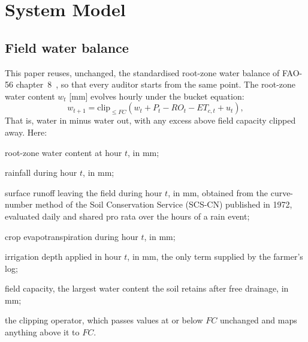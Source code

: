 \section{System Model}
\label{sec:model}

\subsection{Field water balance}

This paper reuses, unchanged, the standardised root-zone water balance of FAO-56
chapter~8~\cite{fao56}, so that every auditor starts from the same point. The root-zone
water content $w_t$ [mm] evolves hourly under the bucket equation:
\begin{equation}
w_{t+1}=\mathrm{clip}_{\le FC}\!\left(w_t+P_t-RO_t-ET_{c,t}+u_t\right),
\label{eq:bucket}
\end{equation}
That is, water in minus water out, with any excess above field capacity clipped
away. Here:
\begin{symbolist}
\item[$w_t$] root-zone water content at hour $t$, in mm;
\item[$P_t$] rainfall during hour $t$, in mm;
\item[$RO_t$] surface runoff leaving the field during hour $t$, in mm, obtained
  from the curve-number method of the Soil Conservation Service (SCS-CN) published
  in 1972, evaluated daily and shared pro rata over the hours of a rain event;
\item[$ET_{c,t}$] crop evapotranspiration during hour $t$, in mm;
\item[$u_t$] irrigation depth applied in hour $t$, in mm, the only term supplied
  by the farmer's log;
\item[$FC$] field capacity, the largest water content the soil retains after free
  drainage, in mm;
\item[$\mathrm{clip}_{\le FC}$] the clipping operator, which passes values at or
  below $FC$ unchanged and maps anything above it to $FC$.
\end{symbolist}

